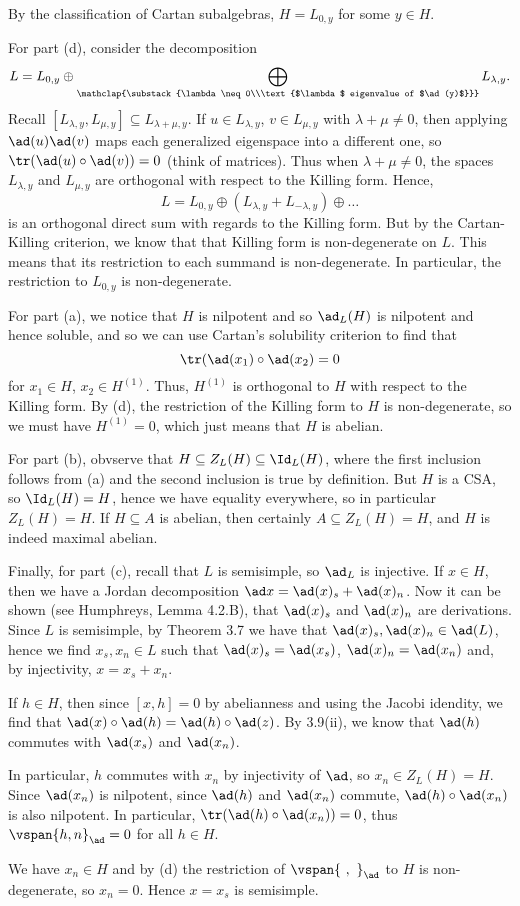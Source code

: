 By the classification of Cartan subalgebras, $H = L_{0, y}$ for some
$y \in H$.

For part (d), consider the decomposition
\[ L = L_{0, y} \oplus \bigoplus_{\mathclap{\substack{\lambda\neq 0\\\text{$\lambda$ eigenvalue of $\ad(y)$}}}} L_{\lambda, y}. \]
Recall $[L_{\lambda, y}, L_{\mu, y}] \subseteq L_{\lambda+\mu, y}$.
If $u \in L_{\lambda, y}$, $v \in L_{\mu, y}$ with $\lambda + \mu \neq 0$, then
applying $\ad(u)\ad(v)$ maps each generalized eigenspace into a different one, so
$\tr(\ad(u) \circ \ad(v)) = 0$ (think of matrices). Thus when
$\lambda + \mu \neq 0$, the spaces $L_{\lambda, y}$ and $L_{\mu, y}$ are
orthogonal with respect to the Killing form. Hence,
\[ L = L_{0, y} \oplus (L_{\lambda, y} + L_{-\lambda, y}) \oplus \ldots \]
is an orthogonal direct sum with regards to the Killing form. But by
the Cartan-Killing criterion, we know that that Killing form is non-degenerate
on $L$. This means that its restriction to each summand is non-degenerate. In
particular, the restriction to $L_{0, y}$ is non-degenerate.

For part (a), we notice that $H$ is nilpotent and so $\ad_L(H)$ is nilpotent
and hence soluble, and so we can use Cartan's solubility criterion to find that
\[ \tr(\ad(x_1) \circ \ad(x_2) = 0 \]
for $x_1 \in H$, $x_2 \in H^{(1)}$. Thus, $H^{(1)}$ is orthogonal to $H$ with respect
to the Killing form. By (d), the restriction of the Killing form to $H$ is
non-degenerate, so we must have $H^{(1)} = 0$, which just means that $H$ is
abelian.

For part (b), obvserve that $H \subseteq Z_L(H) \subseteq \Id_L(H)$, where the first
inclusion follows from (a) and the second inclusion is true by definition.
But $H$ is a CSA, so $\Id_L(H) = H$, hence we have equality everywhere, so in
particular $Z_L(H) = H$. If $H \subseteq A$ is abelian, then certainly $A \subseteq Z_L(H) = H$,
and $H$ is indeed maximal abelian.

Finally, for part (c), recall that $L$ is semisimple, so
$\ad_L$ is injective. If $x \in H$, then we have a Jordan decomposition
$\ad x = \ad(x)_s + \ad(x)_n$. Now it can be shown (see Humphreys, Lemma 4.2.B),
that $\ad(x)_s$ and $\ad(x)_n$ are derivations. Since $L$ is semisimple, by
Theorem 3.7 we have that $\ad(x)_s, \ad(x)_n \in \ad(L)$, hence we find
$x_s, x_n \in L$ such that $\ad(x)_s = \ad(x_s)$, $\ad(x)_n = \ad(x_n)$ and,
by injectivity, $x = x_s + x_n$.

If $h \in H$, then since $[x, h] = 0$ by abelianness and using the Jacobi
idendity, we find that $\ad(x) \circ \ad(h) = \ad(h) \circ \ad(z)$. By
3.9(ii), we know that $\ad(h)$ commutes with $\ad(x_s)$ and $\ad(x_n)$.

In particular, $h$ commutes with $x_n$ by injectivity of $\ad$, so
$x_n \in Z_L(H) = H$. Since $\ad(x_n)$ is nilpotent, since $\ad(h)$ and $\ad(x_n)$
commute, $\ad(h) \circ\ad(x_n)$ is also nilpotent. In particular,
$\tr(\ad(h) \circ \ad(x_n)) = 0$, thus $\vspan{h, n}_{\ad} = 0$ for all $h \in H$.

We have $x_n \in H$ and by (d) the restriction of $\vspan{\ ,\ }_{\ad}$ to $H$
is non-degenerate, so $x_n = 0$. Hence $x = x_s$ is semisimple.
